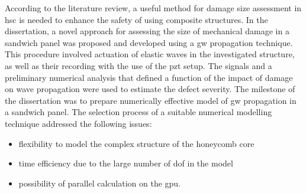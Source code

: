 According to the literature review, a useful method for damage size assessment in \ac{hsc} is needed to enhance the safety of using composite structures.
In the dissertation, a novel approach for assessing the size of mechanical damage in a sandwich panel was proposed and developed using a \ac{gw} propagation technique.
This procedure involved actuation of elastic waves in the investigated structure, as well as their recording with the use of the \ac{pzt} setup.
The signals and a preliminary numerical analysis that defined a function of the impact of damage on wave propagation were used to estimate the defect severity.
The milestone of the dissertation was to prepare numerically effective model of \ac{gw} propagation in a sandwich panel.
The selection process of a suitable numerical modelling technique addressed the following issues:
\begin{itemize}
	\item flexibility to model the complex structure of the honeycomb core
	\item time efficiency due to the large number of \ac{dof} in the model
	\item possibility of parallel calculation on the \ac{gpu}.
\end{itemize}